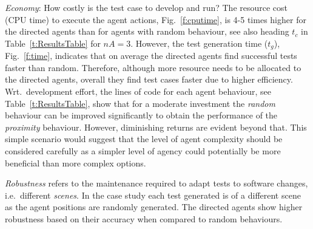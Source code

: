 \documentclass[letterpaper, 10 pt, journal, twoside]{IEEEtran}
\begin{document}
\textit{Economy}: How costly is the test case to develop and run? %
The resource cost (CPU time) to execute the agent actions, Fig.~\ref{f:cputime}, is 4-5 times higher for the directed agents than for agents with random behaviour, see also heading $t_{c}$ in Table~\ref{t:ResultsTable} for $nA=3$. %
	However, the test generation time ($t_g$), Fig.~\ref{f:time}, indicates that on average the directed agents find successful tests faster than random. Therefore, although more resource needs to be  allocated to the directed agents, overall they find test cases faster due to higher efficiency. %
%	
Wrt.\ development effort, the lines of code for each agent behaviour, see Table~\ref{t:ResultsTable}, show that for a moderate investment the \textit{random} behaviour can be improved significantly to obtain the performance of the \textit{proximity} behaviour. However, diminishing returns are evident beyond that. 
%
%
This simple scenario would suggest that the level of agent complexity should be considered carefully as a simpler level of agency could potentially be more beneficial than more complex options. 

\textit{Robustness} refers to the maintenance required to adapt tests to software changes, i.e.\ different \textit{scenes}. In the case study each test generated is of a different scene as the agent positions are randomly generated. The directed agents show higher robustness based on their accuracy when compared to random behaviours. 


\end{document}
